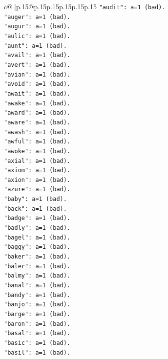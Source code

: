 \documentclass{article}
\begin{document}
{\begin{supertabular}{c@{$\;$}|p{.15\linewidth}@{}p{.15\linewidth}p{.15\linewidth}p{.15\linewidth}p{.15\linewidth}p{.15\linewidth}}
{{{\texttt{"audit": a=1 (bad).} \\
\texttt{"auger": a=1 (bad).} \\
\texttt{"augur": a=1 (bad).} \\
\texttt{"aulic": a=1 (bad).} \\
\texttt{"aunt": a=1 (bad).} \\
\texttt{"avail": a=1 (bad).} \\
\texttt{"avert": a=1 (bad).} \\
\texttt{"avian": a=1 (bad).} \\
\texttt{"avoid": a=1 (bad).} \\
\texttt{"await": a=1 (bad).} \\
\texttt{"awake": a=1 (bad).} \\
\texttt{"award": a=1 (bad).} \\
\texttt{"aware": a=1 (bad).} \\
\texttt{"awash": a=1 (bad).} \\
\texttt{"awful": a=1 (bad).} \\
\texttt{"awoke": a=1 (bad).} \\
\texttt{"axial": a=1 (bad).} \\
\texttt{"axiom": a=1 (bad).} \\
\texttt{"axion": a=1 (bad).} \\
\texttt{"azure": a=1 (bad).} \\
\texttt{"baby": a=1 (bad).} \\
\texttt{"back": a=1 (bad).} \\
\texttt{"badge": a=1 (bad).} \\
\texttt{"badly": a=1 (bad).} \\
\texttt{"bagel": a=1 (bad).} \\
\texttt{"baggy": a=1 (bad).} \\
\texttt{"baker": a=1 (bad).} \\
\texttt{"baler": a=1 (bad).} \\
\texttt{"balmy": a=1 (bad).} \\
\texttt{"banal": a=1 (bad).} \\
\texttt{"bandy": a=1 (bad).} \\
\texttt{"banjo": a=1 (bad).} \\
\texttt{"barge": a=1 (bad).} \\
\texttt{"baron": a=1 (bad).} \\
\texttt{"basal": a=1 (bad).} \\
\texttt{"basic": a=1 (bad).} \\
\texttt{"basil": a=1 (bad).} \\
}}}
\end{supertabular}}
\end{document}

